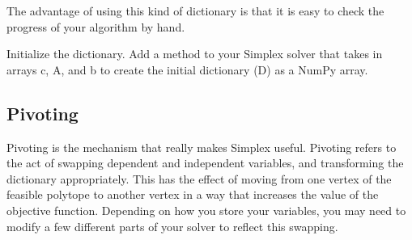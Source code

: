 The advantage of using this kind of dictionary is that it is easy to check the progress of your algorithm by hand.

\begin{problem}{Initialize the dictionary.}
Add a method to your Simplex solver that takes in arrays c, A, and b to create the initial dictionary (D) as a NumPy array.
\label{prob:makedictionary}
\end{problem}

\subsection{Pivoting} %

Pivoting is the mechanism that really makes Simplex useful.
Pivoting refers to the act of swapping dependent and independent variables, and transforming the dictionary appropriately.
This has the effect of moving from one vertex of the feasible polytope to another vertex in a way that increases the value of the objective function.
Depending on how you store your variables, you may need to modify a few different parts of your solver to reflect this swapping.

